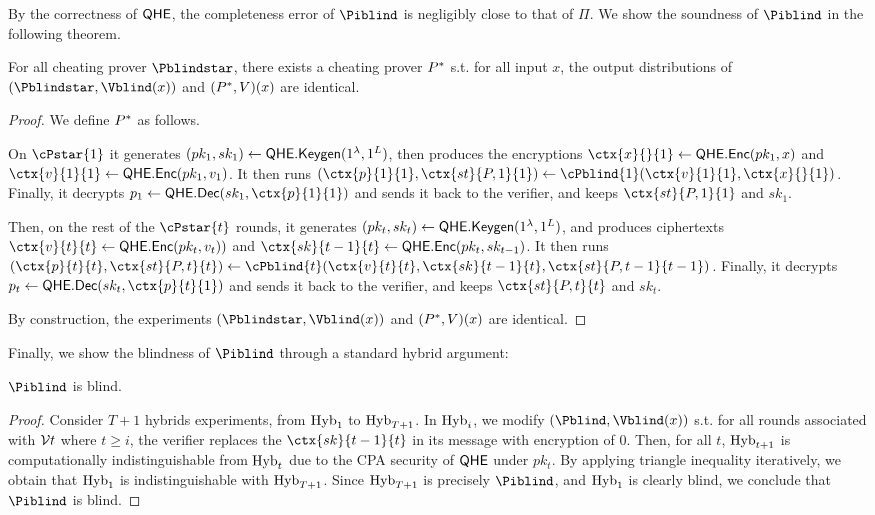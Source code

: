 By the correctness of $\mathsf{QHE}$, the completeness error of $\Piblind$ is negligibly close to that of $\Pi$.
We show the soundness of $\Piblind$ in the following theorem.

\begin{theorem}
	For all cheating prover $\Pblindstar$, there exists a cheating prover $P^*$ s.t. for all input $x$, the output distributions of $(\Pblindstar, \Vblind(x))$ and $(P^*, V)(x)$ are identical.
\end{theorem}
\begin{proof}
	We define $P^*$ as follows.
	
	On $\cPstar{1}$ it generates
	$(pk_1, sk_1)\leftarrow\mathsf{QHE.Keygen}(1^\lambda, 1^L)$, then produces the encryptions
	$\ctx{x}{}{1}\leftarrow\QEnc(pk_1, x)$ and $\ctx{v}{1}{1}\leftarrow\QEnc(pk_1, v_1)$.
	It then runs $(\ctx{p}{1}{1}, \ctx{st}{P, 1}{1})\leftarrow\cPblind{1}(\ctx{v}{1}{1}, \ctx{x}{}{1})$.
	Finally, it decrypts $p_1\leftarrow\QDec(sk_1, \ctx{p}{1}{1})$ and sends it back to the verifier,
	and keeps $\ctx{st}{P, 1}{1}$ and $sk_1$.

	Then, on the rest of the $\cPstar{t}$ rounds, it generates
	$(pk_t, sk_t)\leftarrow\mathsf{QHE.Keygen}(1^\lambda, 1^L)$, and produces ciphertexts
	$\ctx{v}{t}{t}\leftarrow\QEnc(pk_t, v_t))$ and $\ctx{sk}{t-1}{t}\leftarrow\QEnc(pk_t, sk_{t-1})$.
	It then runs $(\ctx{p}{t}{t}, \ctx{st}{P, t}{t})\leftarrow\cPblind{t}(\ctx{v}{t}{t}, \ctx{sk}{t-1}{t}, \ctx{st}{P, t-1}{t-1})$.
	Finally, it decrypts $p_t\leftarrow\QDec(sk_t, \ctx{p}{t}{1})$ and sends it back to the verifier,
	and keeps $\ctx{st}{P, t}{t}$ and $sk_t$.
		
	By construction, the experiments $(\Pblindstar, \Vblind(x))$ and $(P^*, V)(x)$ are identical.
\end{proof}

Finally, we show the blindness of $\Piblind$ through a standard hybrid argument:
\begin{theorem}
	$\Piblind$ is blind.
\end{theorem}
\begin{proof}
	Consider $T+1$ hybrids experiments, from $\operatorname{Hyb}_1$ to $\operatorname{Hyb}_{T+1}$.
	In $\operatorname{Hyb}_i$, we modify $(\Pblind, \Vblind(x))$ s.t.
	for all rounds associated with $\mathcal{V}{t}$ where $t\geq i$, the verifier replaces the $\ctx{sk}{t-1}{t}$ in its message with encryption of $0$.
	Then, for all $t$, $\operatorname{Hyb}_{t+1}$ is computationally indistinguishable from $\operatorname{Hyb}_t$ due to the CPA security of $\mathsf{QHE}$ under $pk_t$.
	By applying triangle inequality iteratively, we obtain that $\operatorname{Hyb}_1$ is indistinguishable with $\operatorname{Hyb}_{T+1}$.
	Since $\operatorname{Hyb}_{T+1}$ is precisely $\Piblind$, and $\operatorname{Hyb}_1$ is clearly blind, we conclude that $\Piblind$ is blind.
\end{proof}
